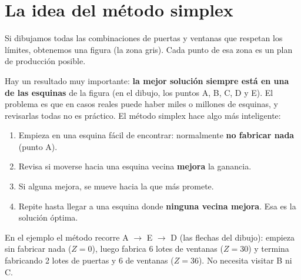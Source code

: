 \documentclass[11pt,a4paper]{article}
\begin{document}
\section{La idea del método simplex}

Si dibujamos todas las combinaciones de puertas y ventanas que respetan los límites, obtenemos una figura
(la zona gris). Cada punto de esa zona es un plan de producción posible.

\begin{center}
\end{center}

Hay un resultado muy importante: \textbf{la mejor solución siempre está en una de las esquinas} de la figura
(en el dibujo, los puntos A, B, C, D y E). El problema es que en casos reales puede haber miles o millones de
esquinas, y revisarlas todas no es práctico. El método simplex hace algo más inteligente:

\begin{enumerate}[itemsep=3pt]
  \item Empieza en una esquina fácil de encontrar: normalmente \textbf{no fabricar nada} (punto A).
  \item Revisa si moverse hacia una esquina vecina \textbf{mejora} la ganancia.
  \item Si alguna mejora, se mueve hacia la que más promete.
  \item Repite hasta llegar a una esquina donde \textbf{ninguna vecina mejora}. Esa es la solución óptima.
\end{enumerate}

En el ejemplo el método recorre A $\to$ E $\to$ D (las flechas del dibujo): empieza sin fabricar nada
($Z = 0$), luego fabrica 6 lotes de ventanas ($Z = 30$) y termina fabricando 2 lotes de puertas y 6 de ventanas
($Z = 36$). No necesita visitar B ni C.
\end{document}
